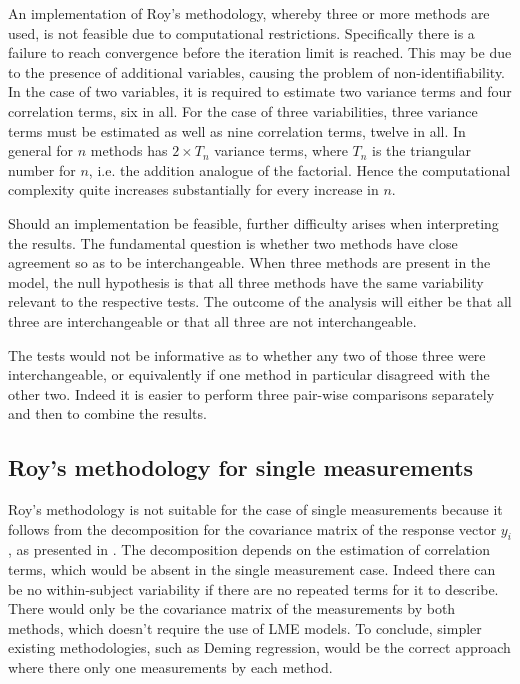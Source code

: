 \documentclass[12pt, a4paper]{report}
\theoremstyle{plain}
\theoremstyle{definition}
\theoremstyle{remark}
\begin{document}
	An implementation of Roy's methodology, whereby three or more methods are used, is not feasible due to computational restrictions. Specifically there is a failure to reach convergence before the iteration limit is reached. This may be due to the presence of additional variables, causing the problem of non-identifiability. In the case of two variables, it is required to estimate two variance terms and four correlation terms, six in all. For the case of three variabilities, three variance terms must be estimated as well as nine correlation terms, twelve in all. In general for $n$ methods has $2 \times T_{n}$ variance terms, where $T_n$ is the triangular number for $n$, i.e. the addition analogue of the factorial. Hence the computational complexity quite increases substantially for every increase in $n$.
	
	Should an implementation be feasible, further difficulty arises when interpreting the results. The fundamental question is whether two methods have close agreement so as to be interchangeable. When three methods are present in the model, the null hypothesis is that all three methods have the same variability relevant to the respective tests. The outcome of the analysis will either be that all three are interchangeable or that all three are not interchangeable.
	
	The tests would not be informative as to whether any two of those three were interchangeable, or equivalently if one method in particular disagreed with the other two. Indeed it is easier to perform three pair-wise comparisons separately and then to combine the results.
	
	
	\subsection{Roy's methodology for single measurements}
	
	Roy's methodology is not suitable for the case of single measurements because it follows from the decomposition for the covariance matrix of the response vector $y_{i}$, as presented in \citet{hamlett}. The decomposition depends on the estimation of correlation terms, which would be absent in the single measurement case. Indeed there can be no within-subject variability if there are no repeated terms for it to describe. There would only be the covariance matrix of the measurements by both methods, which doesn't require the use of LME models. To conclude, simpler existing methodologies, such as Deming regression, would be the correct approach where there only one measurements by each method.
	
\end{document}
